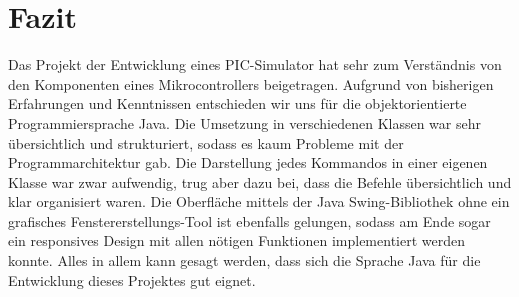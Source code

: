 \chapter{Fazit}

Das Projekt der Entwicklung eines PIC-Simulator hat sehr zum Verständnis von den Komponenten eines Mikrocontrollers beigetragen. Aufgrund von bisherigen Erfahrungen und Kenntnissen entschieden wir uns für die objektorientierte Programmiersprache Java.
Die Umsetzung in verschiedenen Klassen war sehr übersichtlich und strukturiert, sodass es kaum Probleme mit der Programmarchitektur gab. Die Darstellung jedes Kommandos in einer eigenen Klasse war zwar aufwendig, trug aber dazu bei, dass die Befehle übersichtlich und klar organisiert waren. Die Oberfläche mittels der Java Swing-Bibliothek ohne ein grafisches Fenstererstellungs-Tool ist ebenfalls gelungen, sodass am Ende sogar ein responsives Design mit allen nötigen Funktionen implementiert werden konnte. Alles in allem kann gesagt werden, dass sich die Sprache Java für die Entwicklung dieses Projektes gut eignet.  
